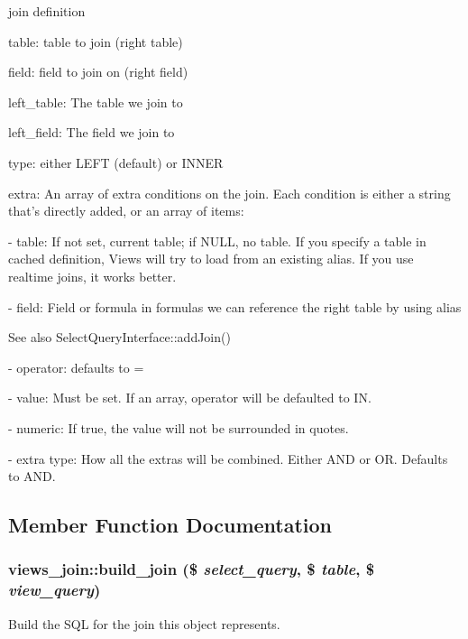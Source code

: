 join definition
\begin{DoxyItemize}
\item table: table to join (right table)
\item field: field to join on (right field)
\item left\_\-table: The table we join to
\item left\_\-field: The field we join to
\item type: either LEFT (default) or INNER
\item extra: An array of extra conditions on the join. Each condition is either a string that's directly added, or an array of items:
\item -\/ table: If not set, current table; if NULL, no table. If you specify a table in cached definition, Views will try to load from an existing alias. If you use realtime joins, it works better.
\item -\/ field: Field or formula in formulas we can reference the right table by using alias \begin{DoxySeeAlso}{See also}
SelectQueryInterface::addJoin()
\end{DoxySeeAlso}

\item -\/ operator: defaults to =
\item -\/ value: Must be set. If an array, operator will be defaulted to IN.
\item -\/ numeric: If true, the value will not be surrounded in quotes.
\item -\/ extra type: How all the extras will be combined. Either AND or OR. Defaults to AND. 
\end{DoxyItemize}

\subsection{Member Function Documentation}
\hypertarget{classviews__join_a1e7fae5813fcec89a848bc6326f152c5}{
\subsubsection[{build\_\-join}]{\setlength{\rightskip}{0pt plus 5cm}views\_\-join::build\_\-join (\$ {\em select\_\-query}, \/  \$ {\em table}, \/  \$ {\em view\_\-query})}}
\label{classviews__join_a1e7fae5813fcec89a848bc6326f152c5}
Build the SQL for the join this object represents.

